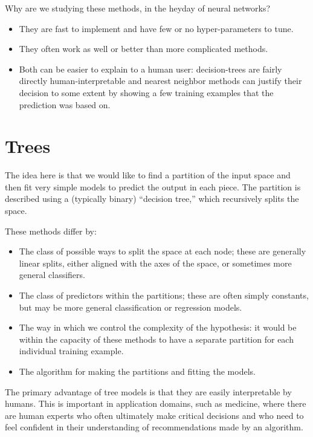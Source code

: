 Why are we studying these methods, in the heyday of neural networks?
\begin{itemize}
\item They are fast to implement and have few or no hyper-parameters
  to tune.
\item They often work as well or better than more complicated methods.
\item Both can be easier to explain to a human user:  decision-trees
  are fairly directly human-interpretable and nearest neighbor methods
  can justify their decision to some extent by showing a few training
  examples that the prediction was based on.
\end{itemize}
    
\section{Trees}
\label{sec:np_trees}

The idea here is that we would like to find a partition of the input
space and then fit very simple models to predict the output in each
piece.  The partition is described using a (typically binary)
``decision tree,''  which recursively splits the space.

These methods differ by:
\begin{itemize}
\item The class of possible ways to split the space at each node;
  these are generally linear splits, either aligned with the axes of
  the space, or sometimes more general classifiers.
\item The class of predictors within the partitions;  these are often
  simply constants, but may be more
  general classification or regression models.
\item The way in which we control the complexity of the hypothesis:
  it would be within the capacity of these methods to have a separate
  partition for each individual training example.
\item The algorithm for making the partitions and fitting the models.
\end{itemize}

The primary advantage of tree models is that they are easily interpretable
by humans.  This is important in application domains, such as
medicine, where there are human experts who often ultimately make 
critical decisions and who need to feel confident in their
understanding of recommendations made by an algorithm.


